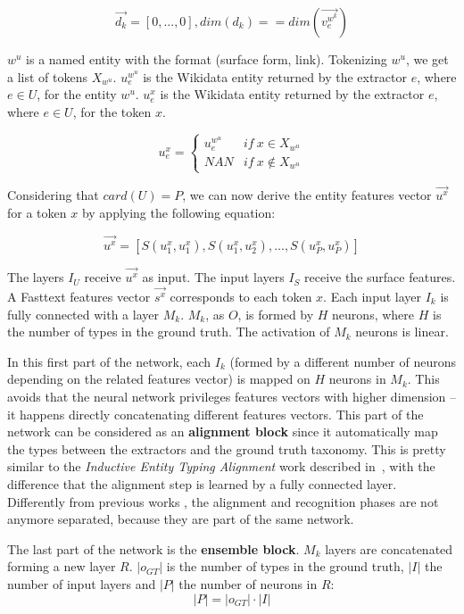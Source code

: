 \documentclass{llncs}
\begin{document}
$$\vec{d_k} = [0,...,0], dim(d_k) == dim(\vec{v^{w^{k}}_{e}})$$

$w^u$ is a named entity with the format (surface form, link). Tokenizing $w^{u}$, we get a list of tokens $X_{w^{u}}$. $u^{w^{u}}_{e}$ is the Wikidata entity returned by the extractor $e$, where $e \in U$, for the entity $w^u$. $u^{x}_{e}$ is the Wikidata entity returned by the extractor $e$, where $e \in U$, for the token $x$. 

\begin{equation} \label{eq:score_feat}
u^{x}_{e} = \left\{\begin{matrix} 
u^{w^{u}}_{e} & if \: x \in X_{w^{u}}\\
NAN & if \: x \notin X_{w^{u}}
\end{matrix}\right.
\end{equation}

Considering that $card(U)=P$, we can now derive the entity features vector $\vec{u^{x}}$ for a token $x$ by applying the following equation: 

$$ \vec{u^{x}} = [S(u^{x}_{1},u^{x}_{1}),S(u^{x}_{1},u^{x}_{2}),...,S(u^{x}_{P},u^{x}_{P})] $$

The layers $I_U$ receive $\vec{u^{x}}$ as input. The input layers $I_S$ receive the surface features. A Fasttext features vector $\vec{s^{x}}$ corresponds to each token $x$. Each input layer $I_k$ is fully connected with a layer $M_k$. $M_k$, as $O$, is formed by $H$ neurons, where $H$ is the number of types in the ground truth. The activation of $M_k$ neurons is linear.

In this first part of the network, each $I_k$ (formed by a different number of neurons depending on the related features vector) is mapped on $H$ neurons in $M_k$. This avoids that the neural network privileges features vectors with higher dimension -- it happens directly concatenating different features vectors. This part of the network can be considered as an \textbf{alignment block} since it automatically map the types between the extractors and the ground truth taxonomy. This is pretty similar to the \textit{Inductive Entity Typing Alignment} work described in~\cite{nerd4}, with the difference that the alignment step is learned by a fully connected layer. Differently from previous works \cite{fox1,fox2}, the alignment and recognition phases are not anymore separated, because they are part of the same network. 

The last part of the network is the \textbf{ensemble block}. $M_k$ layers are concatenated forming a new layer $R$. $\left\vert{o_{GT}}\right\vert$ is the number of types in the ground truth, $\left\vert{I}\right\vert$ the number of input layers and $\left\vert{P}\right\vert$ the number of neurons in $R$:
 $$\left\vert{P}\right\vert =  \left\vert{o_{GT}}\right\vert \cdot \left\vert{I}\right\vert$$
 
\end{document}
